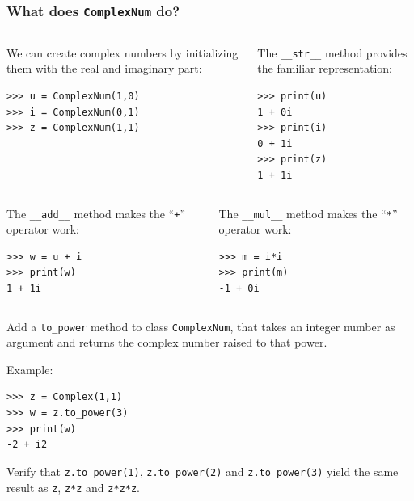 \documentclass[english,serif,mathserif,xcolor=pdftex,dvipsnames,table]{beamer}
\begin{document}
\begin{frame}[fragile]
  \frametitle{What does \texttt{ComplexNum} do?}
  \begin{columns}
    \begin{column}[t]{0.5\linewidth}
      We can create complex numbers by initializing them with the real
      and imaginary part:
\begin{lstlisting}
>>> u = ComplexNum(1,0)
>>> i = ComplexNum(0,1)
>>> z = ComplexNum(1,1)
\end{lstlisting}
    \end{column}
    \begin{column}[t]{0.5\linewidth}
      The \lstinline|__str__| method provides the familiar
      representation:
\begin{lstlisting}
>>> print(u)
1 + 0i
>>> print(i)
0 + 1i
>>> print(z)
1 + 1i
\end{lstlisting}
    \end{column}
  \end{columns}

  \+
  \begin{columns}
    \begin{column}[t]{0.5\linewidth}
      The \lstinline|__add__| method makes the ``\texttt{+}'' operator work:
\begin{lstlisting}
>>> w = u + i
>>> print(w)
1 + 1i
\end{lstlisting}
    \end{column}
    \begin{column}[t]{0.5\linewidth}
      The \lstinline|__mul__| method makes the ``\texttt{*}'' operator work:
\begin{lstlisting}
>>> m = i*i
>>> print(m)
-1 + 0i
\end{lstlisting}
    \end{column}
  \end{columns}
\end{frame}


\begin{frame}[fragile]
  \begin{exercise}
    Add a \lstinline|to_power| method to class \texttt{ComplexNum},
    that takes an integer number as argument and returns the complex
    number raised to that power.

    \+
    Example:
\begin{lstlisting}
>>> z = Complex(1,1)
>>> w = z.to_power(3)
>>> print(w)
-2 + i2
\end{lstlisting}

    \+ Verify that \lstinline|z.to_power(1)|,
    \lstinline|z.to_power(2)| and \lstinline|z.to_power(3)| yield the
    same result as \lstinline|z|, \lstinline|z*z| and
    \lstinline|z*z*z|.
  \end{exercise}
\end{frame}
\end{document}
